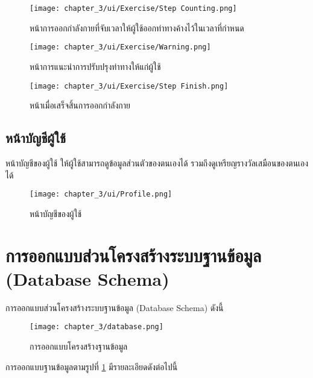\begin{figure}
    \texttt{[image: chapter\_3/ui/Exercise/Step Counting.png]}
    \caption{หน้าการออกกำลังกายที่จับเวลาให้ผู้ใช้ออกท่าทางค้างไว้ในเวลาที่กำหนด}
\end{figure}

\begin{figure}
    \texttt{[image: chapter\_3/ui/Exercise/Warning.png]}
    \caption{หน้าการแนะนำการปรับปรุงท่าทางให้แก่ผู้ใช้}
\end{figure}

\begin{figure}
    \texttt{[image: chapter\_3/ui/Exercise/Step Finish.png]}
    \caption{หน้าเมื่อเสร็จสิ้นการออกกำลังกาย}
\end{figure}

\subsection{หน้าบัญชีผู้ใช้}
หน้าบัญชีของผู้ใช้ ให้ผู้ใช้สามารถดูข้อมูลส่วนตัวของตนเองได้ รวมถึงดูเหรียญรางวัลเสมือนของตนเองได้

\begin{figure}
    \texttt{[image: chapter\_3/ui/Profile.png]}
    \caption{หน้าบัญชีของผู้ใช้}
\end{figure}


\clearpage

\section{การออกแบบส่วนโครงสร้างระบบฐานข้อมูล (Database Schema)}
การออกแบบส่วนโครงสร้างระบบฐานข้อมูล (Database Schema) ดังนี้
\begin{figure}
    \texttt{[image: chapter\_3/database.png]}
    \caption{การออกแบบโครงสร้างฐานข้อมูล}
    \label{fig:db-schema}
\end{figure}
\clearpage
การออกแบบฐานข้อมูลตามรูปที่ \ref{fig:db-schema} มีรายละเอียดดังต่อไปนี้

